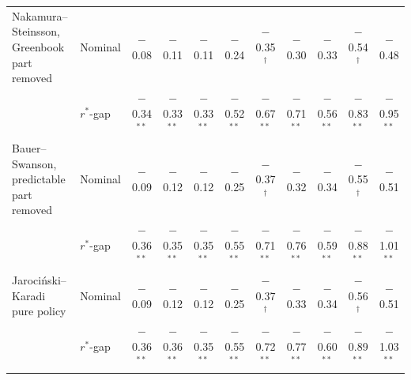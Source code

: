 \begin{tabular}{llccccccccc}
Nakamura--Steinsson, Greenbook part removed & Nominal & $-$0.08 & $-$0.11 & $-$0.11 & $-$0.24 & $-$0.35$^{\dagger}$ & $-$0.30 & $-$0.33 & $-$0.54$^{\dagger}$ & $-$0.48 \\
 & $r^*$-gap & $-$0.34$^{**}$ & $-$0.33$^{**}$ & $-$0.33$^{**}$ & $-$0.52$^{**}$ & $-$0.67$^{**}$ & $-$0.71$^{**}$ & $-$0.56$^{**}$ & $-$0.83$^{**}$ & $-$0.95$^{**}$ \\
Bauer--Swanson, predictable part removed & Nominal & $-$0.09 & $-$0.12 & $-$0.12 & $-$0.25 & $-$0.37$^{\dagger}$ & $-$0.32 & $-$0.34 & $-$0.55$^{\dagger}$ & $-$0.51 \\
 & $r^*$-gap & $-$0.36$^{**}$ & $-$0.35$^{**}$ & $-$0.35$^{**}$ & $-$0.55$^{**}$ & $-$0.71$^{**}$ & $-$0.76$^{**}$ & $-$0.59$^{**}$ & $-$0.88$^{**}$ & $-$1.01$^{**}$ \\
Jaroci\'nski--Karadi pure policy & Nominal & $-$0.09 & $-$0.12 & $-$0.12 & $-$0.25 & $-$0.37$^{\dagger}$ & $-$0.33 & $-$0.34 & $-$0.56$^{\dagger}$ & $-$0.51 \\
 & $r^*$-gap & $-$0.36$^{**}$ & $-$0.36$^{**}$ & $-$0.35$^{**}$ & $-$0.55$^{**}$ & $-$0.72$^{**}$ & $-$0.77$^{**}$ & $-$0.60$^{**}$ & $-$0.89$^{**}$ & $-$1.03$^{**}$ \\
\bottomrule
\end{tabular}
